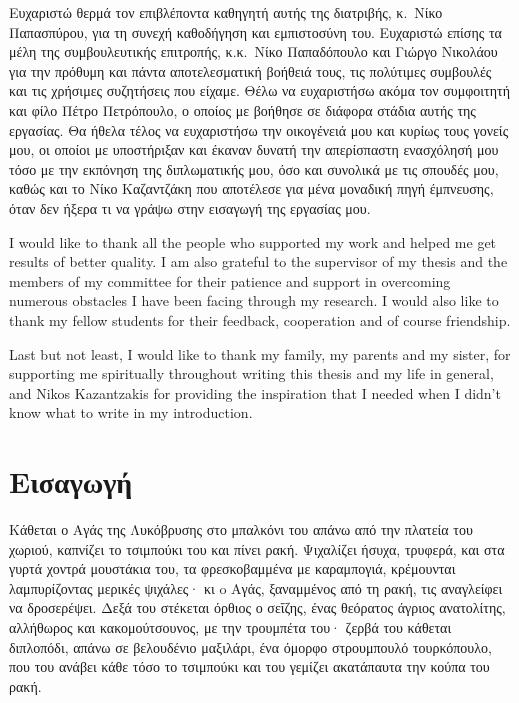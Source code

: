 \documentclass[diploma]{softlab-thesis}
\begin{document}

\begin{acknowledgementsgr}
  Ευχαριστώ θερμά τον επιβλέποντα καθηγητή αυτής της διατριβής,
  κ.~Νίκο Παπασπύρου, για τη συνεχή καθοδήγηση και εμπιστοσύνη
  του. Ευχαριστώ επίσης τα μέλη της συμβουλευτικής επιτροπής,
  κ.κ.~Νίκο Παπαδόπουλο και Γιώργο Νικολάου για την πρόθυμη και
  πάντα αποτελεσματική βοήθειά τους, τις πολύτιμες συμβουλές και
  τις χρήσιμες συζητήσεις που είχαμε.  Θέλω να ευχαριστήσω ακόμα
  τον συμφοιτητή και φίλο Πέτρο Πετρόπουλο, ο οποίος με βοήθησε σε
  διάφορα στάδια αυτής της εργασίας.  Θα ήθελα τέλος να ευχαριστήσω
  την οικογένειά μου και κυρίως τους γονείς μου, οι οποίοι με
  υποστήριξαν και έκαναν δυνατή την απερίσπαστη ενασχόλησή μου τόσο
  με την εκπόνηση της διπλωματικής μου, όσο και συνολικά με τις
  σπουδές μου, καθώς και το Νίκο Καζαντζάκη που αποτέλεσε για μένα
  μοναδική πηγή έμπνευσης, όταν δεν ήξερα τι να γράψω στην εισαγωγή
  της εργασίας μου.
\end{acknowledgementsgr}

\begin{acknowledgementsen}
  I would like to thank all the people who supported my work and helped me get
  results of better quality.  I am also grateful to the supervisor of my thesis
  and the members of my committee for their patience and support in overcoming
  numerous obstacles I have been facing through my research.  I would also like
  to thank my fellow students for their feedback, cooperation and of course
  friendship.

  Last but not least, I would like to thank my family, my parents and my
  sister, for supporting me spiritually throughout writing this thesis and
  my life in general, and Nikos Kazantzakis for providing the inspiration
  that I needed when I didn't know what to write in my introduction.
\end{acknowledgementsen}



\tableofcontents
\listoffigures



\mainmatter

\chapter{Εισαγωγή}

Κάθεται ο Αγάς της Λυκόβρυσης στο μπαλκόνι του απάνω από την πλατεία του
χωριού, καπνίζει το τσιμπούκι του και πίνει ρακή. Ψιχαλίζει ήσυχα, τρυφερά,
και στα γυρτά χοντρά μουστάκια του, τα φρεσκοβαμμένα με καραμπογιά,
κρέμουνται λαμπυρίζοντας μερικές ψιχάλες· κι o Αγάς, ξαναμμένος από τη ρακή,
τις αναγλείφει να δροσερέψει. Δεξά του στέκεται όρθιος ο σεΐζης, ένας
θεόρατος άγριος ανατολίτης, αλλήθωρος και κακομούτσουνος, με την τρουμπέτα
του· ζερβά του κάθεται διπλοπόδι, απάνω σε βελουδένιο μαξιλάρι, ένα όμορφο
στρουμπουλό τουρκόπουλο, που του ανάβει κάθε τόσο το τσιμπούκι και του
γεμίζει ακατάπαυτα την κούπα του ρακή.
\end{document}
